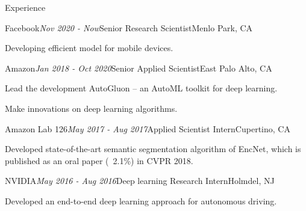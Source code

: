 \documentclass{resume} %
\begin{document}
\begin{rSection}{Experience}

\begin{rSubsection}{Facebook}{\em Nov 2020 - Now}{Senior Research Scientist}{Menlo Park, CA} %
\item Developing efficient model for mobile devices.
\end{rSubsection}

\begin{rSubsection}{Amazon}{\em Jan 2018 - Oct 2020}{Senior Applied Scientist}{East Palo Alto, CA} %
\item Lead the development AutoGluon -- an AutoML toolkit for deep learning. %
\item Make innovations on deep learning algorithms. %
\end{rSubsection}


\begin{rSubsection}{Amazon Lab 126}{\em May 2017 - Aug 2017}{Applied Scientist Intern}{Cupertino, CA}
\item Developed state-of-the-art semantic segmentation algorithm of EncNet, which is published as an oral paper (~2.1\%) in CVPR 2018. 
\end{rSubsection}

\begin{rSubsection}{NVIDIA}{\em May 2016 - Aug 2016}{Deep learning Research Intern}{Holmdel, NJ}
\item Developed an end-to-end deep learning approach for autonomous driving. 
\end{rSubsection}


\end{rSection}
\end{document}
